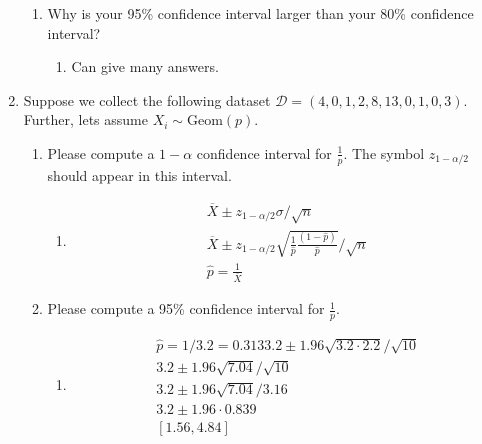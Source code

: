 \documentclass[krantz1,ChapterTOCs]{krantz}
\begin{document}
\begin{enumerate}
\begin{enumerate}
        \item Why is your 95\% confidence interval larger than your 80\% confidence interval?
        \begin{enumerate}
            \item {
            \color{red} 
               Can give many answers.
            } 
        \end{enumerate}

    \end{enumerate}
    
    \item Suppose we collect the following dataset $\mathcal{D} = (4, 0,  1, 2, 8, 13, 0, 1, 0, 3)$. Further, lets assume $X_{i} \sim \text{Geom}(p)$.
        \begin{enumerate}
            \item Please compute a $1-\alpha$ confidence interval for $\frac{1}{p}$. The symbol $z_{1-\alpha/2}$ should appear in this interval. 
            \begin{enumerate}
                 \item {
                     \color{red} 
                        \begin{align}
                         \overline{X} \pm z_{1-\alpha/2} \sigma/\sqrt{n} \\
                         \overline{X} \pm z_{1-\alpha/2} \sqrt{ \frac{1}{\hat{p}} \frac{(1-\hat{p})}{\hat{p}}  } \Big/\sqrt{n} \\
                         \hat{p} = \frac{1}{\overline{X}}
                        \end{align}
                     } 
            \end{enumerate}

            \item Please compute a 95\% confidence interval for $\frac{1}{p}$.
        \begin{enumerate}
            \item {
            \color{red} 
            
            \begin{align}
                \hat{p} = 1/3.2 = 0.313
                3.2 \pm 1.96 \sqrt{3.2 \cdot 2.2} \Big/\sqrt{10} \\
                3.2 \pm 1.96 \sqrt{7.04} \Big/\sqrt{10} \\
                3.2 \pm 1.96 \sqrt{7.04} \Big/3.16 \\
                3.2 \pm 1.96 \cdot 0.839 \\
                [1.56,4.84]
            \end{align}
        
}
\end{enumerate}
\end{enumerate}
\end{enumerate}
\end{document}
